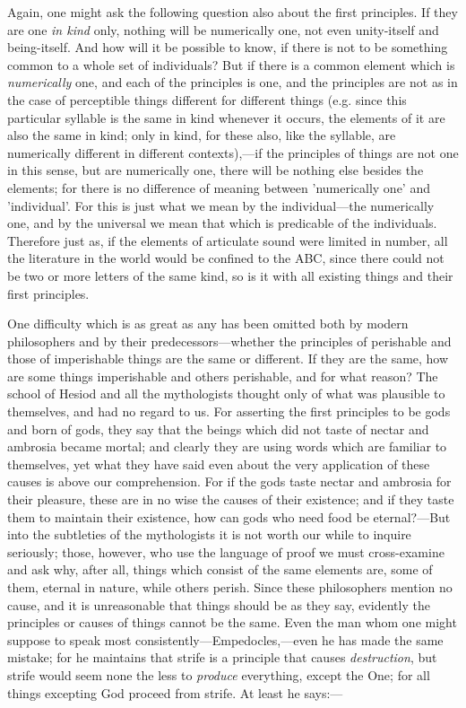 Again, one might ask the following question also about the first principles. If they are one \emph{in kind} only, nothing will be numerically one, not even unity-itself and being-itself. And how will it be possible to know, if there is not to be something common to a whole set of individuals? But if there is a common element which is \emph{numerically} one, and each of the principles is one, and the principles are not as in the case of perceptible things different for different things (e.g. since this particular syllable is the same in kind whenever it occurs, the elements of it are also the same in kind; only in kind, for these also, like the syllable, are numerically different in different contexts),—if the principles of things are not one in this sense, but are numerically one, there will be nothing else besides the elements; for there is no difference of meaning between 'numerically one' and 'individual'. For this is just what we mean by the individual—the numerically one, and by the universal we mean that which is predicable of the individuals. Therefore just as, if the elements of articulate sound were limited in number, all the literature in the world would be confined to the ABC, since there could not be two or more letters of the same kind, so is it with all existing things and their first principles.

One difficulty which is as great as any has been omitted both by modern philosophers and by their predecessors—whether the principles of perishable and those of imperishable things are the same or different. If they are the same, how are some things imperishable and others perishable, and for what reason? The school of Hesiod and all the mythologists thought only of what was plausible to themselves, and had no regard to us. For asserting the first principles to be gods and born of gods, they say that the beings which did not taste of nectar and ambrosia became mortal; and clearly they are using words which are familiar to themselves, yet what they have said even about the very application of these causes is above our comprehension. For if the gods taste nectar and ambrosia for their pleasure, these are in no wise the causes of their existence; and if they taste them to maintain their existence, how can gods who need food be eternal?—But into the subtleties of the mythologists it is not worth our while to inquire seriously; those, however, who use the language of proof we must cross-examine and ask why, after all, things which consist of the same elements are, some of them, eternal in nature, while others perish. Since these philosophers mention no cause, and it is unreasonable that things should be as they say, evidently the principles or causes of things cannot be the same. Even the man whom one might suppose to speak most consistently—Empedocles,—even he has made the same mistake; for he maintains that strife is a principle that causes \emph{destruction}, but strife would seem none the less to \emph{produce} everything, except the One; for all things excepting God proceed from strife. At least he says:—

